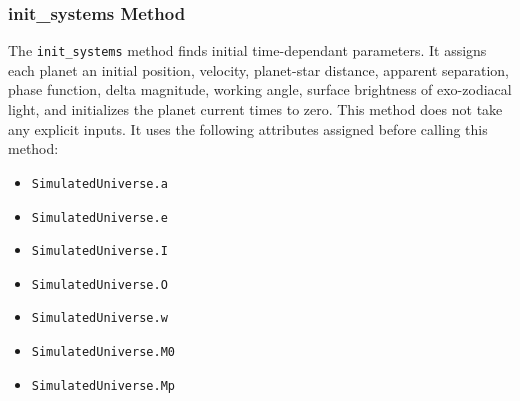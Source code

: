 \documentclass[cleanfoot]{asme2ej}
\begin{document}
\subsubsection{init\_systems Method} \label{sec:initsystemstask}
The \verb+init_systems+ method finds initial time-dependant parameters. It assigns each planet an initial position, velocity, planet-star distance, apparent separation, phase function, delta magnitude, working angle, surface brightness of exo-zodiacal light, and initializes the planet current times to zero. This method does not take any explicit inputs.  It uses the following attributes assigned before calling this method:
\begin{itemize}
    \item \verb+SimulatedUniverse.a+
    \item \verb+SimulatedUniverse.e+
    \item \verb+SimulatedUniverse.I+
    \item \verb+SimulatedUniverse.O+
    \item \verb+SimulatedUniverse.w+
    \item \verb+SimulatedUniverse.M0+
    \item \verb+SimulatedUniverse.Mp+
\end{itemize}
\end{document}
